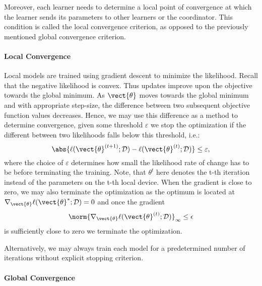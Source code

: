 Moreover, each learner needs to determine a local point of convergence at which the learner sends its parameters to other learners or the coordinator. 
This condition is called the local convergence criterion, as opposed to the previously mentioned global convergence criterion.

\paragraph*{Local Convergence}
Local models are trained using gradient descent to minimize the likelihood. 
Recall that the negative likelihood is convex. 
Thus updates improve upon the objective towards the global minimum.
As $\vect{\theta}$ moves towards the global minimum and with appropriate step-size, the difference between two subsequent objective function values decreases.
Hence, we may use this difference as a method to determine convergence, given some threshold $\varepsilon$ we stop the optimization if the different between two likelihoods falls below this threshold, i.e.:
\begin{equation}
    \label{eq:stopcrit}
    \abs{\ell(\vect{\theta}^{(t+1)} ; \mathcal{D}) - \ell(\vect{\theta}^{(t)} ; \mathcal{D})} \leq \varepsilon,
\end{equation}
where the choice of $\varepsilon$ determines how small the likelihood rate of change has to be before terminating the training.
Note, that $\theta^t$ here denotes the t-th iteration instead of the parameters on the t-th local device.
When the gradient is close to zero, we may also terminate the optimization as the optimum is located at $\nabla_{\vect{\theta}} \ell(\vect{\theta}^{*} ; \mathcal{D}) = 0$ and once the gradient
\begin{equation}
    \norm{\nabla_{\vect{\theta}} \ell(\vect{\theta}^{(t)} ; \mathcal{D})}_{\infty} \leq \epsilon
\end{equation}
is sufficiently close to zero we terminate the optimization. 

Alternatively, we may always train each model for a predetermined number of iterations without explicit stopping criterion.

\paragraph*{Global Convergence}


